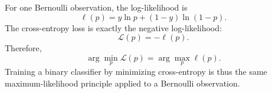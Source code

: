 \begin{solproblema}[prob:0675127]
For one Bernoulli observation, the log-likelihood is
\[
	\ell(p)=y\ln p+(1-y)\ln(1-p).
\]
The cross-entropy loss is exactly the negative log-likelihood:
\[
	\mathcal L(p)=-\ell(p).
\]
Therefore,
\[
	\arg\min_p \mathcal L(p)=\arg\max_p \ell(p).
\]
Training a binary classifier by minimizing cross-entropy is thus the same maximum-likelihood principle applied to a Bernoulli observation.
\end{solproblema}

